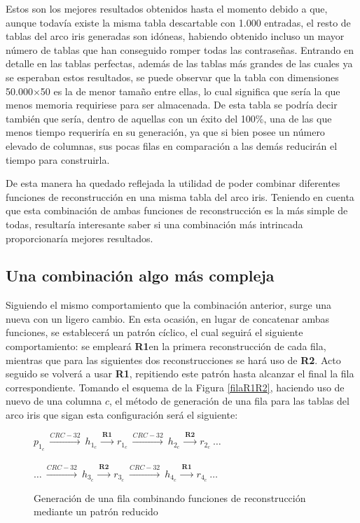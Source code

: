 \documentclass[12pt,spanish,listoffigures,listoftables]{tfgetsinf}
\begin{document}
Estos son los mejores resultados obtenidos hasta el momento debido a que, aunque todavía existe la misma tabla descartable con 1.000 entradas, el resto de tablas del arco iris generadas son idóneas, habiendo obtenido incluso un mayor número de tablas que han conseguido romper todas las contraseñas. Entrando en detalle en las tablas perfectas, además de las tablas más grandes de las cuales ya se esperaban estos resultados, se puede observar que la tabla con dimensiones 50.000$\times$50 es la de menor tamaño entre ellas, lo cual significa que sería la que menos memoria requiriese para ser almacenada. De esta tabla se podría decir también que sería, dentro de aquellas con un éxito del 100\%, una de las que menos tiempo requeriría en su generación, ya que si bien posee un número elevado de columnas, sus pocas filas en comparación a las demás reducirán el tiempo para construirla.

De esta manera ha quedado reflejada la utilidad de poder combinar diferentes funciones de reconstrucción en una misma tabla del arco iris. Teniendo en cuenta que esta combinación de ambas funciones de reconstrucción es la más simple de todas, resultaría interesante saber si una combinación más intrincada proporcionaría mejores resultados.

\subsection{Una combinación algo más compleja}

Siguiendo el mismo comportamiento que la combinación anterior, surge una nueva con un ligero cambio. En esta ocasión, en lugar de concatenar ambas funciones, se establecerá un patrón cíclico, el cual seguirá el siguiente comportamiento: se empleará \textbf{R1}en la primera reconstrucción de cada fila, mientras que para las siguientes dos reconstrucciones se hará uso de \textbf{R2}. Acto seguido se volverá a usar \textbf{R1}, repitiendo este patrón hasta alcanzar el final la fila correspondiente. Tomando el esquema de la Figura \ref{filaR1R2}, haciendo uso de nuevo de una columna $c$, el método de generación de una fila para las tablas del arco iris que sigan esta configuración será el siguiente:

\begin{figure}[H]
	
	\centering

	$p_{1_c}~ \xrightarrow{CRC-32}~ h_{1_c}~ \xrightarrow{\textbf{R1}}~ r_{1_c}~ \xrightarrow{CRC-32}~ h_{2_c}~ \xrightarrow{\textbf{R2}}~ r_{2_c}~ \dots$ \\
	~\\
	$\dots~\xrightarrow{CRC-32}~ h_{3_c}~ \xrightarrow{\textbf{R2}}~ r_{3_c}~\xrightarrow{CRC-32}~ h_{4_c}~ \xrightarrow{\textbf{R1}}~ r_{4_c}~\dots$

	\caption{Generación de una fila combinando funciones de reconstrucción mediante un patrón reducido}
	\label{filapp}

\end{figure}
\end{document}
